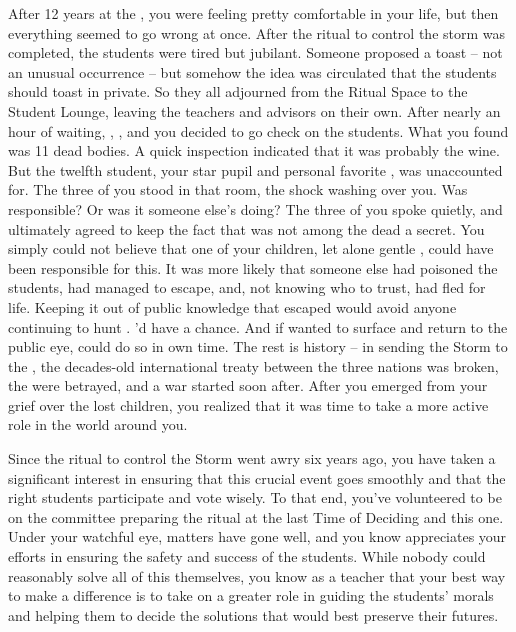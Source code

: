 \documentclass[char]{GL2020}
\begin{document}
After 12 years at the \pSchool{}, you were feeling pretty comfortable in your life, but then everything seemed to go wrong at once. After the ritual to control the storm was completed, the students were tired but jubilant. Someone proposed a toast – not an unusual occurrence – but somehow the idea was circulated that the students should toast in private. So they all adjourned from the Ritual Space to the Student Lounge, leaving the teachers and advisors on their own. After nearly an hour of waiting, \cDiplomat{\full}, \cPrincipal{\full}, and you decided to go check on the students. What you found was 11 dead bodies. A quick inspection indicated that it was probably the wine. But the twelfth student, your star pupil and personal favorite \cKidScientist{\full}, was unaccounted for. The three of you stood in that room, the shock washing over you. Was \cKidScientist{} responsible? Or was it someone else's doing? The three of you spoke quietly, and ultimately agreed to keep the fact that \cKidScientist{} was not among the dead a secret. You simply could not believe that one of your children, let alone gentle \cKidScientist{}, could have been responsible for this. It was more likely that someone else had poisoned the students, \cKidScientist{} had managed to escape, and, not knowing who to trust, had fled for \cKidScientist{\their} life. Keeping it out of public knowledge that \cKidScientist{\they} escaped would avoid anyone continuing to hunt \cKidScientist{\them}. \cKidScientist{\They}'d have a chance. And if \cKidScientist{\they} wanted to surface and return to the public eye, \cKidScientist{\they} could do so in \cKidScientist{\their} own time. The rest is history – in sending the Storm to the \pShip{}, the decades-old international treaty between the three nations was broken, the \pShip{} were betrayed, and a war started soon after. After you emerged from your grief over the lost children, you realized that it was time to take a more active role in the world around you.

Since the ritual to control the Storm went awry six years ago, you have taken a significant interest in ensuring that this crucial event goes smoothly and that the right students participate and vote wisely. To that end, you've volunteered to be on the committee preparing the ritual at the last Time of Deciding and this one. Under your watchful eye, matters have gone well, and you know \cPrincipal{\full} appreciates your efforts in ensuring the safety and success of the students. While nobody could reasonably solve all of this themselves, you know as a teacher that your best way to make a difference is to take on a greater role in guiding the students' morals and helping them to decide the solutions that would best preserve their futures.
\end{document}
